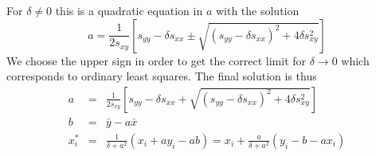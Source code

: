 \documentclass[a4paper,11pt,onepage]{article}
\begin{document}
For $\delta \neq 0$ this is a quadratic equation in $a$ with the solution
\begin{equation}
 a = \frac1{2 s_{xy}} \left[ s_{yy}- \delta s_{xx} \pm \sqrt{ ( s_{yy} - \delta s_{xx})^2 + 4 \delta s_{xy}^2} \right]
\end{equation}
We choose the upper sign in order to get the correct limit for $\delta \rightarrow 0$ which corresponds to ordinary least squares.
The final solution is thus
\begin{eqnarray}
 a &=& \frac1{2 s_{xy}} \left[ s_{yy}- \delta s_{xx} + \sqrt{ ( s_{yy} - \delta s_{xx})^2 + 4 \delta s_{xy}^2} \right] \\
 b &=& \bar y -a \bar x \\
 x_i^* &=& \frac1{\delta+a^2} \left( x_i + a y_i - ab\right) = x_i + \frac{a}{\delta+a^2} \left( y_i -b - a x_i \right)
 \end{eqnarray}
 
\end{document}
